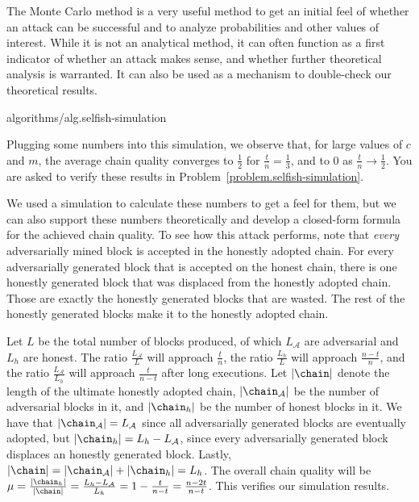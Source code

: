 The Monte Carlo method is a very useful method to get an initial feel of whether
an attack can be successful and to analyze probabilities and other values of interest.
While it is not an analytical method, it can often function as a first indicator
of whether an attack makes sense, and whether further theoretical analysis is warranted.
It can also be used as a mechanism to double-check our theoretical results.

{algorithms/alg.selfish-simulation}

Plugging some numbers into this simulation, we observe that, for large values of $c$
and $m$, the average chain quality converges to $\frac{1}{2}$ for $\frac{t}{n} = \frac{1}{3}$,
and to $0$ as $\frac{t}{n} \rightarrow \frac{1}{2}$. You are asked to verify these
results in Problem~\ref{problem.selfish-simulation}.

We used a simulation to calculate these numbers to get a feel for them, but we can also
support these numbers theoretically and develop a closed-form formula for the achieved
chain quality. To see how this attack performs, note that \emph{every} adversarially
mined block is accepted in the honestly adopted chain. For every adversarially generated
block that is accepted on the honest chain, there is one honestly generated block that
was displaced from the honestly adopted chain. Those are exactly the honestly generated
blocks that are wasted. The rest of the honestly generated blocks make it to the honestly
adopted chain.

Let $L$ be the total number of blocks produced, of which $L_\mathcal{A}$ are
adversarial and $L_h$ are honest. The ratio $\frac{L_\mathcal{A}}{L}$ will
approach $\frac{t}{n}$, the ratio $\frac{L_h}{L}$ will approach
$\frac{n - t}{n}$, and the ratio $\frac{L_\mathcal{A}}{L_h}$
will approach $\frac{t}{n - t}$ after long executions.
Let $|\chain|$ denote the length of the
ultimate honestly adopted chain, $|\chain_\mathcal{A}|$ be the number of
adversarial blocks in it, and $|\chain_h|$ be the number of honest blocks
in it. We have that $|\chain_\mathcal{A}| = L_\mathcal{A}$ since all
adversarially generated blocks are eventually adopted, but
$|\chain_h| = L_h - L_\mathcal{A}$, since every adversarially generated
block displaces an honestly generated block. Lastly,
$|\chain| = |\chain_\mathcal{A}| + |\chain_h| = L_h$.
The overall chain quality will be
$\mu = \frac{|\chain_h|}{|\chain|} = \frac{L_h - L_\mathcal{A}}{L_h} = 1 - \frac{t}{n - t} = \frac{n - 2t}{n - t}$.
This verifies our simulation results.


